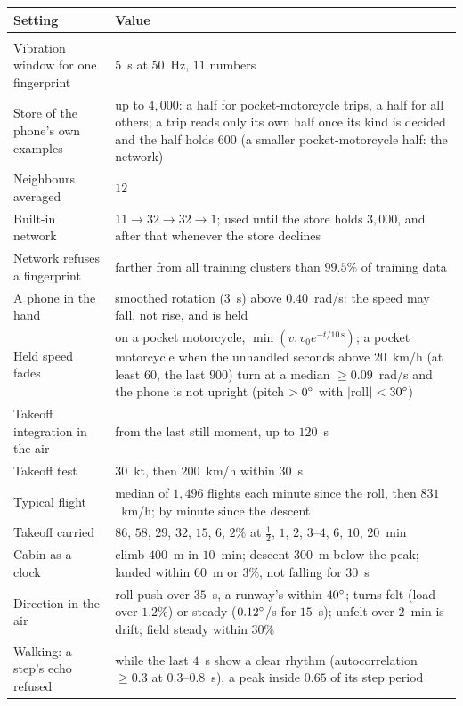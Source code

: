 \begin{tabular}{>{\raggedright\arraybackslash}p{}>{\raggedright\arraybackslash}p{}}
\toprule
Setting & Value\\
\midrule
\multicolumn{2}{l}{\emph{Speed}}\\
Vibration window for one fingerprint & $5$~s at $50$~Hz, $11$ numbers\\
Store of the phone's own examples & up to $4{,}000$: a half for pocket-motorcycle trips, a half for all others; a trip reads only its own half once its kind is decided and the half holds $600$ (a smaller pocket-motorcycle half: the network)\\
Neighbours averaged & $12$\\
Built-in network & $11 \to 32 \to 32 \to 1$; used until the store holds $3{,}000$, and after that whenever the store declines\\
Network refuses a fingerprint & farther from all training clusters than $99.5\%$ of training data\\
A phone in the hand & smoothed rotation ($3$~s) above $0.40$~rad/s: the speed may fall, not rise, and is held\\
Held speed fades & on a pocket motorcycle, $\min(v, v_0 e^{-t/10\,\mathrm{s}})$; a pocket motorcycle when the unhandled seconds above $20$~km/h (at least $60$, the last $900$) turn at a median $\geq 0.09$~rad/s and the phone is not upright (pitch $> 0^\circ$ with $|$roll$| < 30^\circ$)\\
Takeoff integration in the air & from the last still moment, up to $120$~s\\
Takeoff test & $30$~kt, then $200$~km/h within $30$~s\\
Typical flight & median of $1{,}496$ flights each minute since the roll, then $831$~km/h; by minute since the descent\\
Takeoff carried & $86$, $58$, $29$, $32$, $15$, $6$, $2\%$ at $\frac12$, $1$, $2$, $3$--$4$, $6$, $10$, $20$~min\\
Cabin as a clock & climb $400$~m in $10$~min; descent $300$~m below the peak; landed within $60$~m or $3\%$, not falling for $30$~s\\
Direction in the air & roll push over $35$~s, a runway's within $40^\circ$; turns felt (load over $1.2\%$) or steady ($0.12^\circ$/s for $15$~s); unfelt over $2$~min is drift; field steady within $30\%$\\
Walking: a step's echo refused & while the last $4$~s show a clear rhythm (autocorrelation $\geq 0.3$ at $0.3$--$0.8$~s), a peak inside $0.65$ of its step period\\

\end{tabular}
